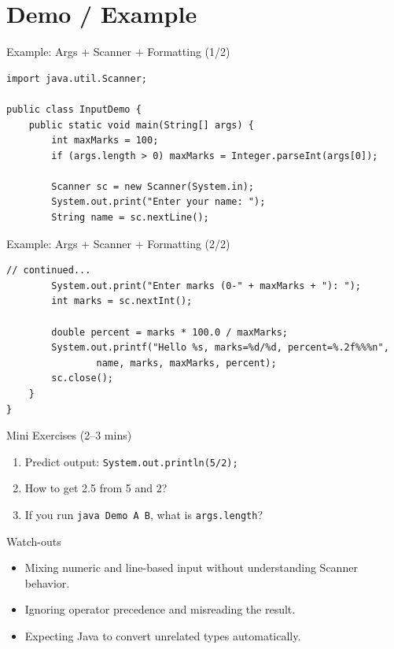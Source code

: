 \documentclass{beamer}
\begin{document}
\section{Demo / Example}
\label{sec:demo}

\begin{frame}[fragile]{Example: Args + Scanner + Formatting (1/2)}
\begin{lstlisting}
import java.util.Scanner;

public class InputDemo {
    public static void main(String[] args) {
        int maxMarks = 100;
        if (args.length > 0) maxMarks = Integer.parseInt(args[0]);

        Scanner sc = new Scanner(System.in);
        System.out.print("Enter your name: ");
        String name = sc.nextLine();
\end{lstlisting}
  \slidesources{\OOPSUnitISources}
\end{frame}

\begin{frame}[fragile]{Example: Args + Scanner + Formatting (2/2)}
\begin{lstlisting}
// continued...
        System.out.print("Enter marks (0-" + maxMarks + "): ");
        int marks = sc.nextInt();

        double percent = marks * 100.0 / maxMarks;
        System.out.printf("Hello %s, marks=%d/%d, percent=%.2f%%%n",
                name, marks, maxMarks, percent);
        sc.close();
    }
}
\end{lstlisting}
  \slidesources{\OOPSUnitISources}
\end{frame}

\begin{frame}{Mini Exercises (2--3 mins)}
  \begin{enumerate}[<+->]
    \item Predict output: \texttt{System.out.println(5/2);}
    \item How to get 2.5 from 5 and 2?
    \item If you run \texttt{java Demo A B}, what is \texttt{args.length}?
  \end{enumerate}
  \slidesources{\OOPSUnitISources}
\end{frame}

\begin{frame}{Watch-outs}
\begin{itemize}[<+->]
  \item Mixing numeric and line-based input without understanding Scanner behavior.
  \item Ignoring operator precedence and misreading the result.
  \item Expecting Java to convert unrelated types automatically.
\end{itemize}
  \slidesources{\OOPSUnitISources}
\end{frame}
\end{document}
